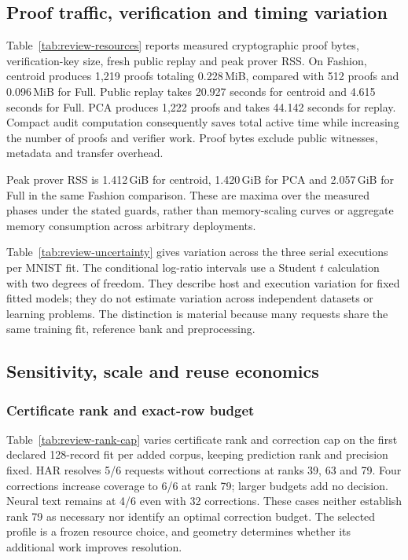 \subsection{Proof traffic, verification and timing variation}
Table~\ref{tab:review-resources} reports measured cryptographic proof bytes,
verification-key size, fresh public replay and peak prover RSS. On Fashion,
centroid produces 1,219 proofs totaling 0.228\,MiB, compared with 512 proofs
and 0.096\,MiB for Full. Public replay takes 20.927 seconds for centroid
and 4.615 seconds for Full. PCA produces 1,222 proofs and takes 44.142
seconds for replay. Compact audit computation consequently saves total
active time while increasing the number of proofs and verifier work.
Proof bytes exclude public witnesses, metadata and transfer overhead.

Peak prover RSS is 1.412\,GiB for centroid, 1.420\,GiB for PCA and
2.057\,GiB for Full in the same Fashion comparison. These are maxima over
the measured phases under the stated guards, rather than memory-scaling
curves or aggregate memory consumption across arbitrary deployments.


Table~\ref{tab:review-uncertainty} gives variation across the three serial
executions per MNIST fit. The conditional log-ratio intervals use a
Student $t$ calculation with two degrees of freedom. They describe host
and execution variation for fixed fitted models; they do not estimate
variation across independent datasets or learning problems. The distinction
is material because many requests share the same training fit, reference
bank and preprocessing.


\subsection{Sensitivity, scale and reuse economics}
\subsubsection{Certificate rank and exact-row budget}
Table~\ref{tab:review-rank-cap} varies certificate rank and correction cap
on the first declared 128-record fit per added corpus, keeping prediction
rank and precision fixed. HAR resolves 5/6 requests without corrections
at ranks 39, 63 and 79. Four corrections increase coverage to 6/6 at rank
79; larger budgets add no decision. Neural text remains at 4/6 even with
32 corrections. These cases neither establish rank 79 as necessary nor
identify an optimal correction budget. The selected profile is a frozen
resource choice, and geometry determines whether its additional work
improves resolution.


